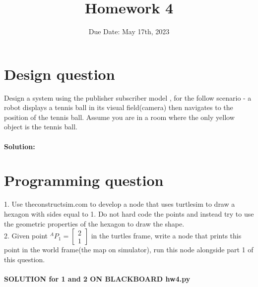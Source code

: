 \documentclass{article}
\title{Homework 4}
\author{}
\date{Due Date: May 17th, 2023}
\begin{document}
\maketitle
{}
\section{Design question}
Design a system using the publisher subscriber model , for the follow scenario - a robot displays a tennis ball in its visual field(camera) then navigates to the position of the tennis ball. Assume you are in a room where the only yellow object is the tennis ball.\\\\
\textbf{Solution: }\\
\label{fig:my_label}
\section{Programming question}
1. Use theconstructsim.com to develop a node that uses turtlesim to draw a hexagon with sides equal to 1. Do not hard code the points and instead try to use the geometric properties of the hexagon to draw the shape.\\
2. Given point ${}^AP_1= \begin{bmatrix} 2 \\1  \end{bmatrix}$ in the turtles frame, write a node that prints this point in the world frame(the map on simulator), run this node alongside part 1 of this question.\\\\

\textbf{SOLUTION for 1 and 2 ON BLACKBOARD hw4.py}
\end{document}
